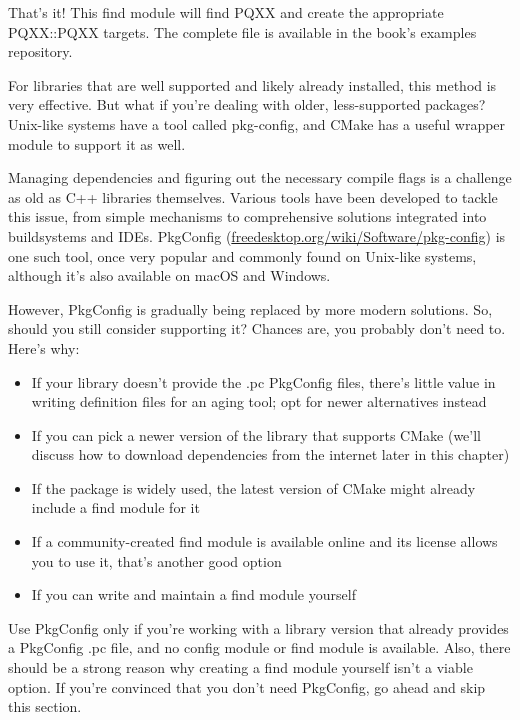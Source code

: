 That’s it! This find module will find PQXX and create the appropriate PQXX::PQXX targets. The complete file is available in the book’s examples repository.

For libraries that are well supported and likely already installed, this method is very effective. But what if you’re dealing with older, less-supported packages? Unix-like systems have a tool called pkg-config, and CMake has a useful wrapper module to support it as well.


Managing dependencies and figuring out the necessary compile flags is a challenge as old as C++ libraries themselves. Various tools have been developed to tackle this issue, from simple mechanisms to comprehensive solutions integrated into buildsystems and IDEs. PkgConfig (\url{freedesktop.org/wiki/Software/pkg-config}) is one such tool, once very popular and commonly found on Unix-like systems, although it’s also available on macOS and Windows.

However, PkgConfig is gradually being replaced by more modern solutions. So, should you still consider supporting it? Chances are, you probably don’t need to. Here’s why:

\begin{itemize}
\item
If your library doesn’t provide the .pc PkgConfig files, there’s little value in writing definition files for an aging tool; opt for newer alternatives instead

\item
If you can pick a newer version of the library that supports CMake (we’ll discuss how to download dependencies from the internet later in this chapter)

\item
If the package is widely used, the latest version of CMake might already include a find module for it

\item
If a community-created find module is available online and its license allows you to use it, that’s another good option

\item
If you can write and maintain a find module yourself
\end{itemize}

Use PkgConfig only if you’re working with a library version that already provides a PkgConfig .pc file, and no config module or find module is available. Also, there should be a strong reason why creating a find module yourself isn’t a viable option. If you’re convinced that you don’t need PkgConfig, go ahead and skip this section.

